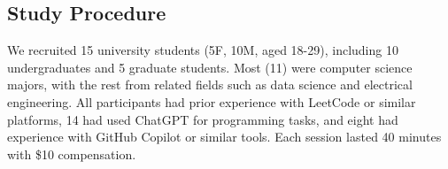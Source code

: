 

\subsection{Study Procedure}
We recruited 15 university students (5F, 10M, aged 18-29), including 10 undergraduates and 5 graduate students. 
Most (11) were computer science majors, with the rest from related fields such as data science and electrical engineering. 
All participants had prior experience with LeetCode or similar platforms, 14 had used ChatGPT for programming tasks, and eight had experience with GitHub Copilot or similar tools. 
Each session lasted 40 minutes with \$10 compensation.


